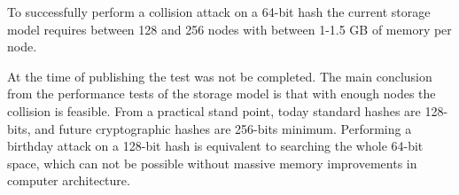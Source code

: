 To successfully perform a collision attack on a 64-bit hash the current storage model requires 
between 128 and 256 nodes with between 1-1.5 GB of memory per node.

At the time of publishing the test was not be completed. The main conclusion from the performance
tests of the storage model is that with enough nodes the collision is feasible. From a practical
stand point, today standard hashes are 128-bits, and future cryptographic hashes are 256-bits minimum.
Performing a birthday attack on a 128-bit hash is equivalent to searching the whole 64-bit space, 
which can not be possible without massive memory improvements in computer architecture.
